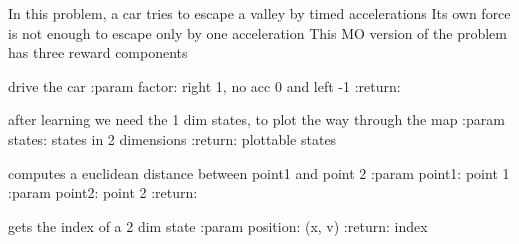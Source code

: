 \documentclass[letterpaper,10pt,english]{sphinxmanual}
\begin{document}
\begin{fulllineitems}
\label{Problems:morl_problems.MountainCar}
In this problem, a car tries to escape a valley by timed accelerations
Its own force is not enough to escape only by one acceleration
This MO version of the problem has three reward components

\begin{fulllineitems}
\label{Problems:morl_problems.MountainCar.car_sim}
drive the car
:param factor: right 1, no acc 0 and left -1
:return:

\end{fulllineitems}


\begin{fulllineitems}
\label{Problems:morl_problems.MountainCar.create_plottable_states}
after learning we need the 1 dim states, to plot the way through the map
:param states: states in 2 dimensions
:return: plottable states

\end{fulllineitems}


\begin{fulllineitems}
\label{Problems:morl_problems.MountainCar.distance}
computes a euclidean distance between point1 and point 2
:param point1: point 1
:param point2: point 2
:return:

\end{fulllineitems}


\begin{fulllineitems}
\label{Problems:morl_problems.MountainCar.get_state}
gets the index of a 2 dim state
:param position: (x, v)
:return: index

\end{fulllineitems}


\end{fulllineitems}
\end{document}
